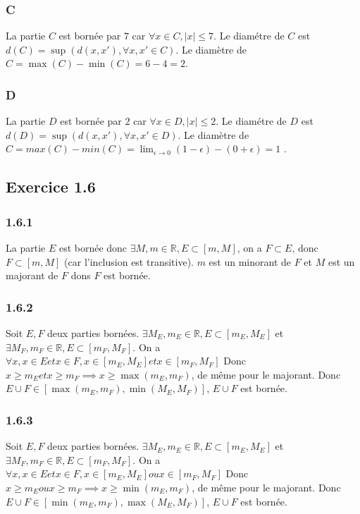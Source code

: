 \documentclass[]{book}
\theoremstyle{definition}
\newcommand{\bb}[1]{\mathbb{#1}}
\newcommand{\R}{\bb{R}}
\begin{document}
\subsubsection*{C}
La partie $C$ est born\'ee par $7$ car $\forall x \in C, |x| \leq 7$. Le diam\'etre de $C$ est $d(C) = \sup(d(x,x'), \forall x,x' \in C)$. Le diam\`etre de $C = \max(C) - \min(C) = 6 -4 = 2$.  

\subsubsection*{D}
La partie $D$ est born\'ee par $2$ car $\forall x \in D, |x| \leq 2$. Le diam\'etre de $D$ est $d(D) = \sup(d(x,x'), \forall x,x' \in D)$. Le diam\`etre de $C = max(C)-min(C) = \lim_{\epsilon \to 0} (1-\epsilon) - (0+\epsilon) = 1$ .  


\subsection*{Exercice 1.6}
\subsubsection*{1.6.1}
La partie $E$ est born\'ee donc $\exists M,m \in \R, E \subset [m,M]$, on a $F \subset E$, donc $F \subset [m,M]$ (car l'inclusion est transitive). $m$ est un minorant de $F$ et $M$ est un majorant de $F$ dons $F$ est born\'ee.

\subsubsection*{1.6.2}
Soit $E, F$ deux parties born\'ees. $\exists M_E,m_E \in \R, E \subset [m_E,M_E]$ et $\exists M_F,m_F \in \R, E \subset [m_F,M_F]$. On a $\forall x, x \in E et x \in F, x \in [m_E, M_E] et x \in [m_F, M_F]$ Donc $x \geq m_E et x \geq m_F \implies x \geq \max(m_E, m_F)$, de m\^eme pour le majorant. Donc $E \cup F \in [\max(m_E,m_F), \min(M_E, M_F)]$, $E \cup F$ est born\'ee.

\subsubsection*{1.6.3}
Soit $E, F$ deux parties born\'ees. $\exists M_E,m_E \in \R, E \subset [m_E,M_E]$ et $\exists M_F,m_F \in \R, E \subset [m_F,M_F]$. On a $\forall x, x \in E et x \in F, x \in [m_E, M_E] ou x \in [m_F, M_F]$ Donc $x \geq m_E ou x \geq m_F \implies x \geq \min(m_E, m_F)$, de m\^eme pour le majorant. Donc $E \cup F \in [\min(m_E,m_F), \max(M_E, M_F)]$, $E \cup F$ est born\'ee.
\end{document}
